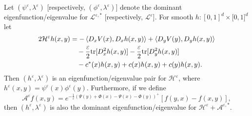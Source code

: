\documentclass[10pt,a4paper]{amsart}
\begin{document}
\begin{lemma}
\label{lem:swap} Let $(\psi^{\varepsilon},\lambda^{\varepsilon})$
[respectively, $(\phi^{\varepsilon},\lambda^{\varepsilon})$] denote the
dominant eigenfunction/eigenvalue for $\mathcal{L}^{\varepsilon,\ast}$
[respectively, $\mathcal{L}^{\varepsilon}$]. For smooth $h:[0,1]^{d}%
\times\lbrack0,1]^{d}$ let
\begin{align*}
2\mathcal{H}^{\varepsilon}h(x,y)  &  =-\left\langle D_{x}V(x),D_{x}%
h(x,y)\right\rangle +\left\langle D_{y}V(y),D_{y}h(x,y)\right\rangle \\
&  \quad-\frac{\varepsilon}{2}\text{\emph{tr}}[D_{x}^{2}h(x,y)]-\frac
{\varepsilon}{2}\text{\emph{tr}}[D_{y}^{2}h(x,y)]\\
&  \quad-c^{\ast}(x)h(x,y)+c(x)h(x,y)+c(y)h(x,y).
\end{align*}
Then $(h^{\varepsilon},\lambda^{\varepsilon})$ is an eigenfunction/eigenvalue
pair for $\mathcal{H}^{\varepsilon}$, where $h^{\varepsilon}(x,y)=\psi
^{\varepsilon}(x)\phi^{\varepsilon}(y)$. Furthermore, if we define
\[
\mathcal{A}^{\varepsilon}f(x,y)=e^{-\frac{1}{\varepsilon}\left(  \Psi
(y)+\Phi(x)-\Psi(x)-\Phi(y)\right)  ^{+}}\left[  f(y,x)-f(x,y)\right]  ,
\]
then $(h^{\varepsilon},\lambda^{\varepsilon})$ is also the dominant
eigenfunction/eigenvalue for $\mathcal{H}^{\varepsilon}+\mathcal{A}%
^{\varepsilon,\ast}$.
\end{lemma}
\end{document}
